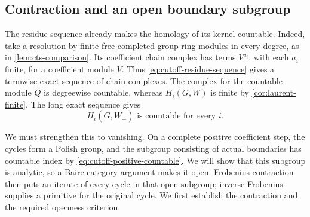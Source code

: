 \subsection{Contraction and an open boundary subgroup}

The residue sequence already makes the homology of its kernel
countable. Indeed, take a resolution by finite free completed group-ring
modules in every degree, as in \cref{lem:cts-comparison}. Its coefficient
chain complex has terms $V^{a_i}$, with each $a_i$ finite, for a
coefficient module $V$. Thus \cref{eq:cutoff-residue-sequence} gives a
termwise exact sequence of chain complexes. The complex for the
countable module $Q$ is degreewise countable, whereas $H_i(G,W)$ is
finite by \cref{cor:laurent-finite}. The long exact sequence gives
\begin{equation}
 H_i(G,W_+)\text{ is countable for every }i.
 \label{eq:cutoff-positive-countable}
\end{equation}

We must strengthen this to vanishing. On a complete positive coefficient
step, the cycles form a Polish group, and the subgroup consisting of
actual boundaries has countable index by
\cref{eq:cutoff-positive-countable}. We will show that this subgroup
is analytic, so a Baire-category argument makes it open. Frobenius
contraction then puts an iterate of every cycle in that open subgroup;
inverse Frobenius supplies a primitive for the original cycle. We first
establish the contraction and the required openness criterion.


